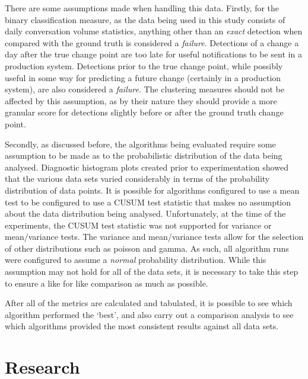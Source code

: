 \documentclass{uvamscse}	%
\begin{document}
There are some assumptions made when handling this data. Firstly, for the binary classification measure, as the data being used in this study consists of daily conversation volume statistics, anything other than an \emph{exact} detection when compared with the ground truth is considered a \emph{failure}. Detections of a change a day after the true change point are too late for useful notifications to be sent in a production system. Detections prior to the true change point, while possibly useful in some way for predicting a future change (certainly in a production system), are also considered a \emph{failure}. The clustering measures should not be affected by this assumption, as by their nature they should provide a more granular score for detections slightly before or after the ground truth change point.

Secondly, as discussed before, the algorithms being evaluated require some assumption to be made as to the probabilistic distribution of the data being analysed. Diagnostic histogram plots created prior to experimentation showed that the various data sets varied considerably in terms of the probability distribution of data points. It is possible for algorithms configured to use a mean test to be configured to use a CUSUM test statistic that makes no assumption about the data distribution being analysed. Unfortunately, at the time of the experiments, the CUSUM test statistic was not supported for variance or mean/variance tests. The variance and mean/variance tests allow for the selection of other distributions such as poisson and gamma. As such, all algorithm runs were configured to assume a \emph{normal} probability distribution. While this assumption may not hold for all of the data sets, it is necessary to take this step to ensure a like for like comparison as much as possible.

After all of the metrics are calculated and tabulated, it is possible to see which algorithm performed the `best', and also carry out a comparison analysis to see which algorithms provided the most consistent results against all data sets.








\chapter{Research}
\end{document}
